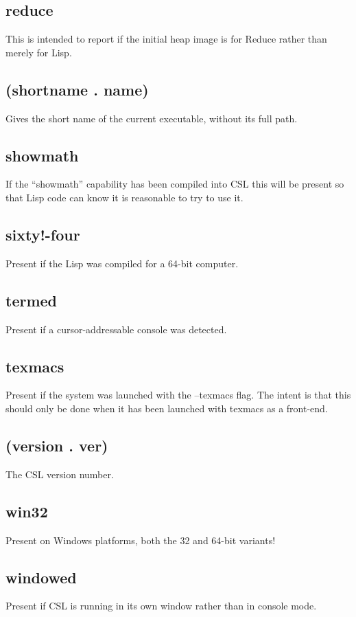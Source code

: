 \documentclass[a4paper,11pt]{article}
\begin{document}
{\subsection{\ttfamily reduce}
This is intended to report if the initial heap image is for Reduce rather than
merely for Lisp.

\subsection{\ttfamily (shortname . name)}
Gives the short name of the current executable, without its full path.

\subsection{\ttfamily showmath}
If the ``showmath'' capability has been compiled into CSL this will be present
so that Lisp code can know it is reasonable to try to use it.

\subsection{\ttfamily sixty!-four}
Present if the Lisp was compiled for a 64-bit computer.

\subsection{\ttfamily termed}
Present if a cursor-addressable console was detected.

\subsection{\ttfamily texmacs}
Present if the system was launched with the {\ttfamily --texmacs} flag.
The intent is that this should only be done when it has been launched with
texmacs as a front-end.

\subsection{\ttfamily (version . ver)}
The CSL version number.

\subsection{\ttfamily win32}
Present on Windows platforms, both the 32 and 64-bit variants!

\subsection{\ttfamily windowed}
Present if CSL is running in its own window rather than in console mode.

}
\end{document}

